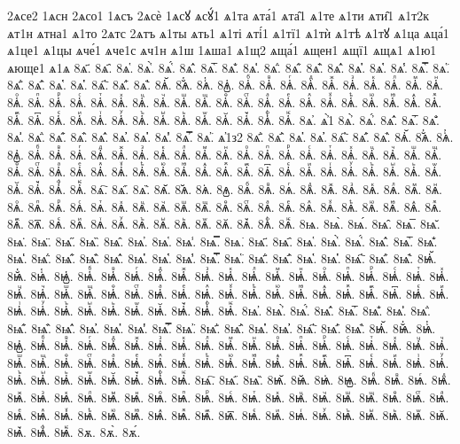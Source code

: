 {2ѧсе2
1ѧсн
2ѧсо1
1ѧсъ
2ѧсѐ
1ѧсꙋ
ѧсꙋ́1
ѧ1та
ѧта́1
ѧта̑1
ѧ1те
ѧ1ти
ѧти̑1
ѧ1т2к
ѧт1н
ѧтна1
ѧ1то
2ѧтс
2ѧтъ
ѧ1ты
ѧть1
ѧ1ті
ѧті́1
ѧ1тї1
ѧ1тѝ
ѧ1тѣ
ѧ1тꙋ
ѧ1ца
ѧца́1
ѧ1це1
ѧ1цы
ѧче́1
ѧче1с
ѧч1н
ѧ1ш
1ѧша1
ѧ1щ2
ѧща́1
ѧщен1
ѧщї1
ѧщѧ1
ѧ1ю1
ѧюще1
ѧ1ѧ
8ѧ҃.
8ѧ҄.
8ѧ҅.
8ѧ҅̀.
8ѧ҅́.
8ѧ҅̂.
8ѧ҅̅.
8ѧ҅̆.
8ѧ҅̇.
8ѧ҅̈.
8ѧ҅̋.
8ѧ҅̏.
8ѧ҅̑.
8ѧ҅̓.
8ѧ҅̔.
8ѧ҅̾.
8ѧ҅̿.
8ѧ҅͘.
8ѧ҅҃.
8ѧ҅҄.
8ѧ҅҅.
8ѧ҅҆.
8ѧ҅҇.
8ѧ҅᷀.
8ѧ҅᷁.
8ѧ҅᷶.
8ѧ᷷҅.
8ѧ᷸҅.
8ѧ᷹҅.
8ѧ҅ⷠ.
8ѧ҅ⷡ.
8ѧ҅ⷢ.
8ѧ҅ⷣ.
8ѧ҅ⷤ.
8ѧ҅ⷥ.
8ѧ҅ⷦ.
8ѧ҅ⷧ.
8ѧ҅ⷨ.
8ѧ҅ⷩ.
8ѧ҅ⷪ.
8ѧ҅ⷫ.
8ѧ҅ⷬ.
8ѧ҅ⷭ.
8ѧ҅ⷮ.
8ѧ҅ⷯ.
8ѧ҅ⷰ.
8ѧ҅ⷱ.
8ѧ҅ⷲ.
8ѧ҅ⷳ.
8ѧ҅ⷴ.
8ѧ҅ⷵ.
8ѧ҅ⷶ.
8ѧ҅ⷷ.
8ѧ҅ⷸ.
8ѧ҅ⷹ.
8ѧ҅ⷺ.
8ѧ҅ⷻ.
8ѧ҅ⷼ.
8ѧ҅ⷽ.
8ѧ҅ⷾ.
8ѧ҅ⷿ.
8ѧ҅꙯.
8ѧ҅ꙴ.
8ѧ҅ꙵ.
8ѧ҅ꙶ.
8ѧ҅ꙷ.
8ѧ҅ꙸ.
8ѧ҅ꙹ.
8ѧ҅ꙺ.
8ѧ҅ꙻ.
8ѧ҅꙼.
8ѧ҅꙽.
8ѧ҅ꚞ.
8ѧ҅ꚟ.
8ѧ҆.
ѧ҆̀1
8ѧ҆̀.
8ѧ҆́.
8ѧ҆̂.
8ѧ҆̅.
8ѧ҆̆.
8ѧ҆̇.
8ѧ҆̈.
8ѧ҆̋.
8ѧ҆̏.
8ѧ҆̑.
8ѧ҆̓.
8ѧ҆̔.
8ѧ҆̾.
8ѧ҆̿.
8ѧ҆͘.
ѧ҆1з2
8ѧ҆҃.
8ѧ҆҄.
8ѧ҆҅.
8ѧ҆҆.
8ѧ҆҇.
8ѧ҆᷀.
8ѧ҆᷁.
8ѧ҆᷶.
8ѧ᷷҆.
8ѧ᷸҆.
8ѧ᷹҆.
8ѧ҆ⷠ.
8ѧ҆ⷡ.
8ѧ҆ⷢ.
8ѧ҆ⷣ.
8ѧ҆ⷤ.
8ѧ҆ⷥ.
8ѧ҆ⷦ.
8ѧ҆ⷧ.
8ѧ҆ⷨ.
8ѧ҆ⷩ.
8ѧ҆ⷪ.
8ѧ҆ⷫ.
8ѧ҆ⷬ.
8ѧ҆ⷭ.
8ѧ҆ⷮ.
8ѧ҆ⷯ.
8ѧ҆ⷰ.
8ѧ҆ⷱ.
8ѧ҆ⷲ.
8ѧ҆ⷳ.
8ѧ҆ⷴ.
8ѧ҆ⷵ.
8ѧ҆ⷶ.
8ѧ҆ⷷ.
8ѧ҆ⷸ.
8ѧ҆ⷹ.
8ѧ҆ⷺ.
8ѧ҆ⷻ.
8ѧ҆ⷼ.
8ѧ҆ⷽ.
8ѧ҆ⷾ.
8ѧ҆ⷿ.
8ѧ҆꙯.
8ѧ҆ꙴ.
8ѧ҆ꙵ.
8ѧ҆ꙶ.
8ѧ҆ꙷ.
8ѧ҆ꙸ.
8ѧ҆ꙹ.
8ѧ҆ꙺ.
8ѧ҆ꙻ.
8ѧ҆꙼.
8ѧ҆꙽.
8ѧ҆ꚞ.
8ѧ҆ꚟ.
8ѧ҇.
8ѧ᷀.
8ѧ᷁.
8ѧ᷶.
8ѧ᷷.
8ѧ᷸.
8ѧ᷹.
8ѧⷠ.
8ѧⷡ.
8ѧⷢ.
8ѧⷣ.
8ѧⷤ.
8ѧⷥ.
8ѧⷦ.
8ѧⷧ.
8ѧⷨ.
8ѧⷩ.
8ѧⷪ.
8ѧⷫ.
8ѧⷬ.
8ѧⷭ.
8ѧⷮ.
8ѧⷯ.
8ѧⷰ.
8ѧⷱ.
8ѧⷲ.
8ѧⷳ.
8ѧⷴ.
8ѧⷵ.
8ѧⷶ.
8ѧⷷ.
8ѧⷸ.
8ѧⷹ.
8ѧⷺ.
8ѧⷻ.
8ѧⷼ.
8ѧⷽ.
8ѧⷾ.
8ѧⷿ.
8ѧ꙯.
8ѧꙴ.
8ѧꙵ.
8ѧꙶ.
8ѧꙷ.
8ѧꙸ.
8ѧꙹ.
8ѧꙺ.
8ѧꙻ.
8ѧ꙼.
8ѧ꙽.
8ѧꚞ.
8ѧꚟ.
8ѩ.
8ѩ̀.
8ѩ́.
8ѩ̂.
8ѩ̅.
8ѩ̆.
8ѩ̇.
8ѩ̈.
8ѩ̋.
8ѩ̏.
8ѩ̑.
8ѩ̓.
8ѩ̔.
8ѩ̾.
8ѩ̿.
8ѩ͘.
8ѩ҃.
8ѩ҄.
8ѩ҅.
8ѩ҅̀.
8ѩ҅́.
8ѩ҅̂.
8ѩ҅̅.
8ѩ҅̆.
8ѩ҅̇.
8ѩ҅̈.
8ѩ҅̋.
8ѩ҅̏.
8ѩ҅̑.
8ѩ҅̓.
8ѩ҅̔.
8ѩ҅̾.
8ѩ҅̿.
8ѩ҅͘.
8ѩ҅҃.
8ѩ҅҄.
8ѩ҅҅.
8ѩ҅҆.
8ѩ҅҇.
8ѩ҅᷀.
8ѩ҅᷁.
8ѩ҅᷶.
8ѩ᷷҅.
8ѩ᷸҅.
8ѩ᷹҅.
8ѩ҅ⷠ.
8ѩ҅ⷡ.
8ѩ҅ⷢ.
8ѩ҅ⷣ.
8ѩ҅ⷤ.
8ѩ҅ⷥ.
8ѩ҅ⷦ.
8ѩ҅ⷧ.
8ѩ҅ⷨ.
8ѩ҅ⷩ.
8ѩ҅ⷪ.
8ѩ҅ⷫ.
8ѩ҅ⷬ.
8ѩ҅ⷭ.
8ѩ҅ⷮ.
8ѩ҅ⷯ.
8ѩ҅ⷰ.
8ѩ҅ⷱ.
8ѩ҅ⷲ.
8ѩ҅ⷳ.
8ѩ҅ⷴ.
8ѩ҅ⷵ.
8ѩ҅ⷶ.
8ѩ҅ⷷ.
8ѩ҅ⷸ.
8ѩ҅ⷹ.
8ѩ҅ⷺ.
8ѩ҅ⷻ.
8ѩ҅ⷼ.
8ѩ҅ⷽ.
8ѩ҅ⷾ.
8ѩ҅ⷿ.
8ѩ҅꙯.
8ѩ҅ꙴ.
8ѩ҅ꙵ.
8ѩ҅ꙶ.
8ѩ҅ꙷ.
8ѩ҅ꙸ.
8ѩ҅ꙹ.
8ѩ҅ꙺ.
8ѩ҅ꙻ.
8ѩ҅꙼.
8ѩ҅꙽.
8ѩ҅ꚞ.
8ѩ҅ꚟ.
8ѩ҆.
8ѩ҆̀.
8ѩ҆́.
8ѩ҆̂.
8ѩ҆̅.
8ѩ҆̆.
8ѩ҆̇.
8ѩ҆̈.
8ѩ҆̋.
8ѩ҆̏.
8ѩ҆̑.
8ѩ҆̓.
8ѩ҆̔.
8ѩ҆̾.
8ѩ҆̿.
8ѩ҆͘.
8ѩ҆҃.
8ѩ҆҄.
8ѩ҆҅.
8ѩ҆҆.
8ѩ҆҇.
8ѩ҆᷀.
8ѩ҆᷁.
8ѩ҆᷶.
8ѩ᷷҆.
8ѩ᷸҆.
8ѩ᷹҆.
8ѩ҆ⷠ.
8ѩ҆ⷡ.
8ѩ҆ⷢ.
8ѩ҆ⷣ.
8ѩ҆ⷤ.
8ѩ҆ⷥ.
8ѩ҆ⷦ.
8ѩ҆ⷧ.
8ѩ҆ⷨ.
8ѩ҆ⷩ.
8ѩ҆ⷪ.
8ѩ҆ⷫ.
8ѩ҆ⷬ.
8ѩ҆ⷭ.
8ѩ҆ⷮ.
8ѩ҆ⷯ.
8ѩ҆ⷰ.
8ѩ҆ⷱ.
8ѩ҆ⷲ.
8ѩ҆ⷳ.
8ѩ҆ⷴ.
8ѩ҆ⷵ.
8ѩ҆ⷶ.
8ѩ҆ⷷ.
8ѩ҆ⷸ.
8ѩ҆ⷹ.
8ѩ҆ⷺ.
8ѩ҆ⷻ.
8ѩ҆ⷼ.
8ѩ҆ⷽ.
8ѩ҆ⷾ.
8ѩ҆ⷿ.
8ѩ҆꙯.
8ѩ҆ꙴ.
8ѩ҆ꙵ.
8ѩ҆ꙶ.
8ѩ҆ꙷ.
8ѩ҆ꙸ.
8ѩ҆ꙹ.
8ѩ҆ꙺ.
8ѩ҆ꙻ.
8ѩ҆꙼.
8ѩ҆꙽.
8ѩ҆ꚞ.
8ѩ҆ꚟ.
8ѩ҇.
8ѩ᷀.
8ѩ᷁.
8ѩ᷶.
8ѩ᷷.
8ѩ᷸.
8ѩ᷹.
8ѩⷠ.
8ѩⷡ.
8ѩⷢ.
8ѩⷣ.
8ѩⷤ.
8ѩⷥ.
8ѩⷦ.
8ѩⷧ.
8ѩⷨ.
8ѩⷩ.
8ѩⷪ.
8ѩⷫ.
8ѩⷬ.
8ѩⷭ.
8ѩⷮ.
8ѩⷯ.
8ѩⷰ.
8ѩⷱ.
8ѩⷲ.
8ѩⷳ.
8ѩⷴ.
8ѩⷵ.
8ѩⷶ.
8ѩⷷ.
8ѩⷸ.
8ѩⷹ.
8ѩⷺ.
8ѩⷻ.
8ѩⷼ.
8ѩⷽ.
8ѩⷾ.
8ѩⷿ.
8ѩ꙯.
8ѩꙴ.
8ѩꙵ.
8ѩꙶ.
8ѩꙷ.
8ѩꙸ.
8ѩꙹ.
8ѩꙺ.
8ѩꙻ.
8ѩ꙼.
8ѩ꙽.
8ѩꚞ.
8ѩꚟ.
8ѫ.
8ѫ̀.
8ѫ́.
}
